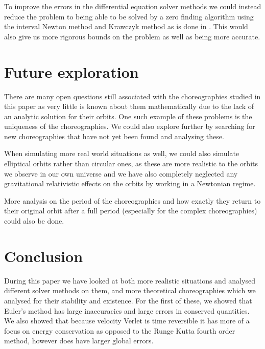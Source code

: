 \documentclass[11pt]{article}
\begin{document}
\medskip

To improve the errors in the differential equation solver methods we could instead reduce the problem to being able to be solved by a zero finding algorithm using the interval Newton method and Krawczyk method as is done in \cite{NbodyLinearChain}. This would also give us more rigorous bounds on the problem as well as being more accurate.



\centering
\section{Future exploration}
\raggedright

There are many open questions still associated with the choreographies studied in this paper as very little is known about them mathematically due to the lack of an analytic solution for their orbits. One such example of these problems is the uniqueness of the choreographies. We could also explore further by searching for new choreographies that have not yet been found and analysing these.

When simulating more real world situations as well, we could also simulate elliptical orbits rather than circular ones, as these are more realistic to the orbits we observe in our own universe and we have also completely neglected any gravitational relativistic effects on the orbits by working in a Newtonian regime.

More analysis on the period of the choreographies and how exactly they return to their original orbit after a full period (especially for the complex choreographies) could also be done.





\centering
\section{Conclusion}
\raggedright

During this paper we have looked at both more realistic situations and analysed different solver methods on them, and more theoretical choreographies which we analysed for their stability and existence. For the first of these, we showed that Euler's method has large inaccuracies and large errors in conserved quantities. We also showed that because velocity Verlet is time reversible it has more of a focus on energy conservation as opposed to the Runge Kutta fourth order method, however does have larger global errors.
\end{document}
